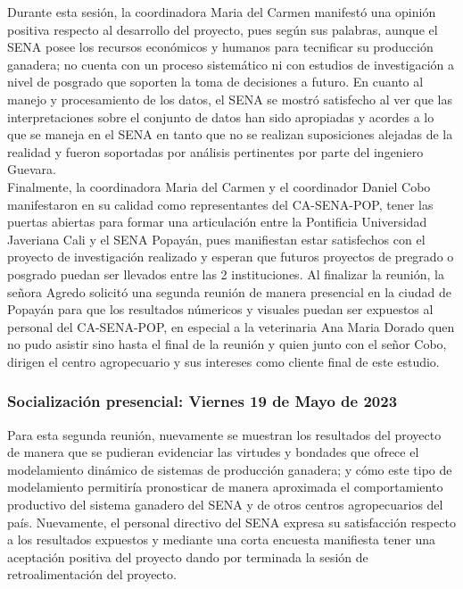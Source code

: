 Durante esta sesión, la coordinadora Maria del Carmen manifestó una opinión positiva respecto al desarrollo del proyecto, pues según sus palabras, aunque el SENA posee los recursos económicos y humanos para tecnificar su producción ganadera; no cuenta con un proceso sistemático ni con estudios de investigación a nivel de posgrado que soporten la toma de decisiones a futuro. 
En cuanto al manejo y procesamiento de los datos, el SENA se mostró satisfecho al ver que las interpretaciones sobre el conjunto de datos han sido apropiadas y acordes a lo que se maneja en el SENA en tanto que no se realizan suposiciones alejadas de la realidad y fueron soportadas por análisis pertinentes por parte del ingeniero Guevara.\\

Finalmente, la coordinadora Maria del Carmen y el coordinador Daniel Cobo manifestaron en su calidad como representantes del CA-SENA-POP, tener las puertas abiertas para formar una articulación entre la Pontificia Universidad Javeriana Cali y el SENA Popayán, pues manifiestan estar satisfechos con el proyecto de investigación realizado y esperan que futuros proyectos de pregrado o posgrado puedan ser llevados entre las 2 instituciones.
Al finalizar la reunión, la señora Agredo solicitó una segunda reunión de manera presencial en la ciudad de Popayán para que los resultados númericos y visuales puedan ser expuestos al personal del CA-SENA-POP, en especial a la veterinaria Ana Maria Dorado quen no pudo asistir sino hasta el final de la reunión y quien junto con el señor Cobo, dirigen el centro agropecuario y sus intereses como cliente final de este estudio.


\subsubsection{Socialización presencial: Viernes 19 de Mayo de 2023}


Para esta segunda reunión, nuevamente se muestran los resultados del proyecto de manera que se pudieran evidenciar las virtudes y bondades que ofrece el modelamiento dinámico de sistemas de producción ganadera; y cómo este tipo de modelamiento permitiría pronosticar de manera aproximada el comportamiento productivo del sistema ganadero del SENA y de otros centros agropecuarios del país. Nuevamente, el personal directivo del SENA expresa su satisfacción respecto a los resultados expuestos y mediante una corta encuesta manifiesta tener una aceptación positiva del proyecto dando por terminada la sesión de retroalimentación del proyecto. \\ 

